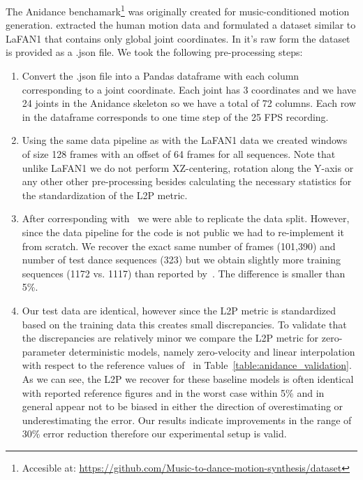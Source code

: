 \documentclass[letterpaper]{article} \usepackage[]{aaai23}  \usepackage{times}  \usepackage{helvet}  \usepackage{courier}  \usepackage[hyphens]{url}  \usepackage{graphicx} \urlstyle{rm} \def\UrlFont{\rm}  \usepackage{natbib}  \usepackage{caption} \frenchspacing  \setlength{\pdfpagewidth}{8.5in} \setlength{\pdfpageheight}{11in}
\begin{document}
The Anidance benchamark\footnote{Accesible at: \url{https://github.com/Music-to-dance-motion-synthesis/dataset}} was originally created for music-conditioned motion generation. \citet{duan2021singleshot} extracted the human motion data and formulated a dataset similar to LaFAN1 that contains only global joint coordinates.
In it's raw form the dataset is provided as a .json file. We took the following pre-processing steps:
\begin{enumerate}
    \item Convert the .json file into a Pandas dataframe with each column corresponding to a joint coordinate. Each joint has 3 coordinates  and we have 24 joints in the Anidance skeleton so we have a total of 72 columns. Each row in the dataframe corresponds to one time step of the 25 FPS recording.
    \item Using the same data pipeline as with the LaFAN1 data we created windows of size 128 frames with an offset of 64 frames for all sequences. Note that unlike LaFAN1 we do not perform XZ-centering, rotation along the Y-axis or any other other pre-processing besides calculating the necessary statistics for the standardization of the L2P metric.
    \item After corresponding with~\citet{duan2021singleshot} we were able to replicate the data split. However, since the data pipeline for the code is not public we had to re-implement it from scratch. We recover the exact same number of frames (101,390) and number of test dance sequences (323) but we obtain slightly more training sequences (1172 vs. 1117) than reported by~\citet{duan2021singleshot}. The difference is smaller than 5\%.
    \item Our test data are identical, however since the L2P metric is standardized based on the training data this creates small discrepancies. To validate that the discrepancies are relatively minor we compare the L2P metric for zero-parameter deterministic models, namely zero-velocity and linear interpolation with respect to the reference values of~\citet{duan2021singleshot} in Table~\ref{table:anidance_validation}. As we can see, the L2P we recover for these baseline models is often identical with reported reference figures and in the worst case within 5\% and in general appear not to be biased in either the direction of overestimating or underestimating the error. Our results indicate improvements in the range of 30\% error reduction therefore our experimental setup is valid.
\end{enumerate}
\end{document}
